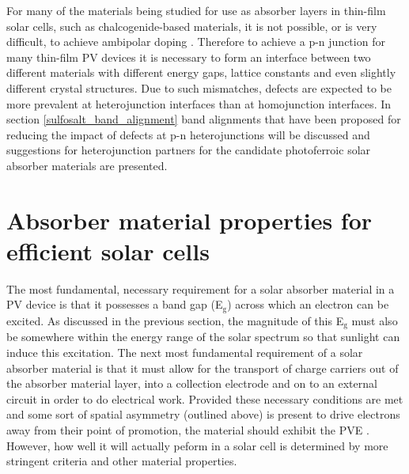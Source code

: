 \documentclass[11pt, twoside]{report}
\begin{document}
For many of the materials being studied for use as absorber layers in thin-film solar cells, such as chalcogenide-based materials, it is not possible, or is very difficult, to achieve ambipolar doping \cite{band_alignment_review, Zhang_doping_limits}. Therefore to achieve a p-n junction for many thin-film PV devices it is necessary to form an interface between two different materials with different energy gaps, lattice constants and even slightly different crystal structures. Due to such mismatches, defects are expected to be more prevalent at heterojunction interfaces than at homojunction interfaces. In section \ref{sulfosalt_band_alignment} band alignments that have been proposed for reducing the impact of defects at p-n heterojunctions will be discussed and suggestions for heterojunction partners for the candidate photoferroic solar absorber materials are presented.


\section{Absorber material properties for efficient solar cells}\label{PV_properties}
The most fundamental, necessary requirement for a solar absorber material in a PV device is that it possesses a band gap (E$_\mathrm{g}$) across which an electron can be excited. As discussed in the previous section, the magnitude of this E$_\mathrm{g}$ must also be somewhere within the energy range of the solar spectrum so that sunlight can induce this excitation. The next most fundamental requirement of a solar absorber material is that it must allow for the transport of charge carriers out of the absorber material layer, into a collection electrode and on to an external circuit in order to do electrical work. Provided these necessary conditions are met and some sort of spatial asymmetry (outlined above) is present to drive electrons away from their point of promotion, the material should exhibit the PVE \cite{Nelson2}. However, how well it will actually peform in a solar cell is determined by more stringent criteria and other material properties. 
\end{document}
